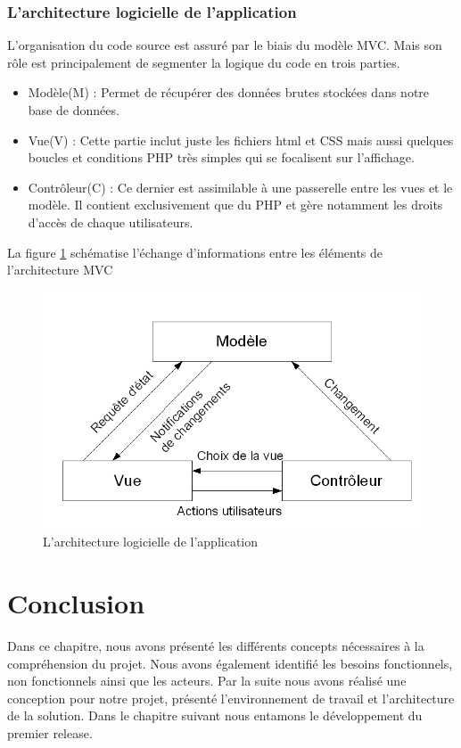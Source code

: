 \subsubsection{L'architecture  logicielle de l’application}
L’organisation du code source est assuré par le biais du modèle MVC. Mais son rôle est principalement de segmenter la logique du code en trois parties. 
\begin{itemize}
	\item Modèle(M) : Permet de récupérer des données brutes stockées dans notre base de données.
	\item Vue(V) : Cette partie inclut juste les fichiers html et CSS mais aussi quelques boucles et conditions PHP très simples qui se focalisent sur l’affichage. 
	\item Contrôleur(C) : Ce dernier est assimilable à une passerelle entre les vues et le modèle. Il contient exclusivement que du PHP et gère notamment les droits d’accès de chaque utilisateurs. 
\end{itemize}\newpage
La figure \ref{fig:mvc} schématise l’échange d’informations entre les éléments de l’architecture MVC
\begin{figure}[H]
	\centering
	\includegraphics[width=0.7\linewidth]{img/mvc}
	\caption[L'architecture logicielle de l’application]{L'architecture logicielle de l’application}
	\label{fig:mvc}
\end{figure}

\section*{Conclusion}
Dans ce chapitre, nous avons présenté les différents concepts nécessaires à la compréhension du projet. Nous avons également identifié les besoins fonctionnels, non fonctionnels ainsi que les acteurs. Par la suite nous avons réalisé une conception pour notre projet, présenté l’environnement de travail et l’architecture de la solution. Dans le chapitre suivant nous entamons le développement du premier release.